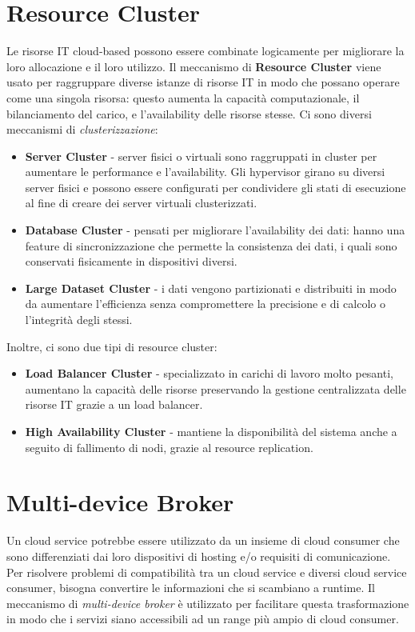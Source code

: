 \section{Resource Cluster}
Le risorse IT cloud-based possono essere combinate logicamente per migliorare la loro allocazione e il loro utilizzo. Il meccanismo di \textbf{Resource Cluster} viene usato per raggruppare diverse istanze di risorse IT in modo che possano operare come una singola risorsa: questo aumenta la capacità computazionale, il bilanciamento del carico, e l'availability delle risorse stesse. Ci sono diversi meccanismi di \textit{clusterizzazione}:
\begin{itemize}
    \item \textbf{Server Cluster} - server fisici o virtuali sono raggruppati in cluster per aumentare le performance e l'availability. Gli hypervisor girano su diversi server fisici e possono essere configurati per condividere gli stati di esecuzione al fine di creare dei server virtuali clusterizzati.
    \item \textbf{Database Cluster} - pensati per migliorare l'availability dei dati: hanno una feature di sincronizzazione che permette la consistenza dei dati, i quali sono conservati fisicamente in dispositivi diversi.
    \item \textbf{Large Dataset Cluster} - i dati vengono partizionati e distribuiti in modo da aumentare l'efficienza senza compromettere la precisione e di calcolo o l'integrità degli stessi.
\end{itemize}
Inoltre, ci sono due tipi di resource cluster:
\begin{itemize}
    \item \textbf{Load Balancer Cluster} - specializzato in carichi di lavoro molto pesanti, aumentano la capacità delle risorse preservando la gestione centralizzata delle risorse IT grazie a un load balancer.
    \item \textbf{High Availability Cluster} - mantiene la disponibilità del sistema anche a seguito di fallimento di nodi, grazie al resource replication.
\end{itemize}
\section{Multi-device Broker}
Un cloud service potrebbe essere utilizzato da un insieme di cloud consumer che sono differenziati dai loro dispositivi di hosting e/o requisiti di comunicazione. Per risolvere problemi di compatibilità tra un cloud service e diversi cloud service consumer, bisogna convertire le informazioni che si scambiano a runtime. Il meccanismo di \textit{multi-device broker} è utilizzato per facilitare questa trasformazione in modo che i servizi siano accessibili ad un range più ampio di cloud consumer.

